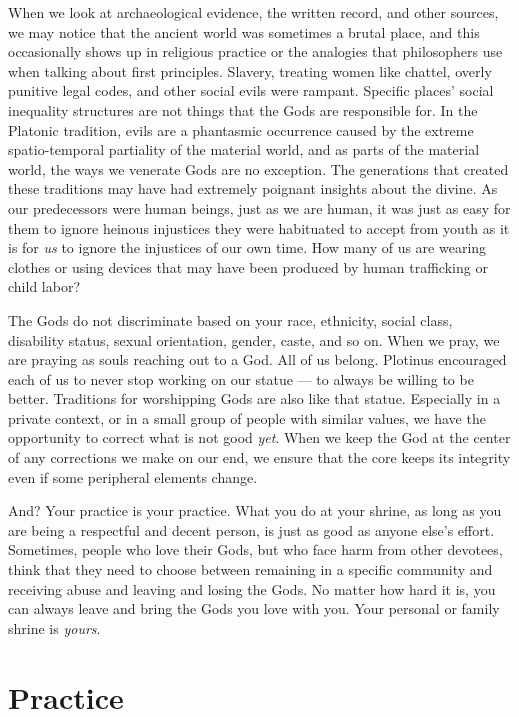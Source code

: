 \documentclass[
]{book}
\begin{document}
When we look at archaeological evidence, the written record, and other sources, we may notice that the ancient world was sometimes a brutal place, and this occasionally shows up in religious practice or the analogies that philosophers use when talking about first principles. Slavery, treating women like chattel, overly punitive legal codes, and other social evils were rampant. Specific places' social inequality structures are not things that the Gods are responsible for. In the Platonic tradition, evils are a phantasmic occurrence caused by the extreme spatio-temporal partiality of the material world, and as parts of the material world, the ways we venerate Gods are no exception. The generations that created these traditions may have had extremely poignant insights about the divine. As our predecessors were human beings, just as we are human, it was just as easy for them to ignore heinous injustices they were habituated to accept from youth as it is for \emph{us} to ignore the injustices of our own time. How many of us are wearing clothes or using devices that may have been produced by human trafficking or child labor?

The Gods do not discriminate based on your race, ethnicity, social class, disability status, sexual orientation, gender, caste, and so on. When we pray, we are praying as souls reaching out to a God. All of us belong. Plotinus encouraged each of us to never stop working on our statue --- to always be willing to be better. Traditions for worshipping Gods are also like that statue. Especially in a private context, or in a small group of people with similar values, we have the opportunity to correct what is not good \emph{yet}. When we keep the God at the center of any corrections we make on our end, we ensure that the core keeps its integrity even if some peripheral elements change.

And? Your practice is your practice. What you do at your shrine, as long as you are being a respectful and decent person, is just as good as anyone else's effort. Sometimes, people who love their Gods, but who face harm from other devotees, think that they need to choose between remaining in a specific community and receiving abuse and leaving and losing the Gods. No matter how hard it is, you can always leave and bring the Gods you love with you. Your personal or family shrine is \emph{yours}.

\hypertarget{practice}{%
\section{Practice}\label{practice}}
\end{document}

